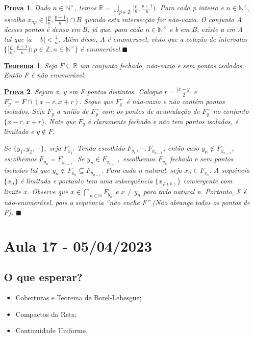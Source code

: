\documentclass{article}
\newtheorem*{theorem*}{\underline{Teorema}}
\newtheorem*{proof*}{\underline{Prova}}
\renewcommand\qedsymbol{$\blacksquare$}
\begin{document}
\begin{proof*}
  Dado $n\in \mathbb{N}^{\times}$, temos $\mathbb{R} = \displaystyle\bigcup_{p\in \mathbb{Z}}^{}{\biggl[\frac{p}{n}, \frac{p+1}{n}\biggr)}$. Para
  cada p inteiro e $n\in \mathbb{N}^{\times}$, escolha $x_{np}\in\biggl[\frac{p}{n}, \frac{p+1}{n}\biggr)\cap{B}$ quando esta intersec\c c\~ao
  for n\~ao-vazia. O conjunto A desses pontos \'e denso em B, j\'a que, para cada $n\in \mathbb{N}^{\times}$ e b em B, existe a em A
  tal que $|a-b|<\frac{1}{n}$. Al\'em disso, A \'e enumer\'avel, visto que a cole\c c\~ao de intervalos $\biggl\{\biggl[\frac{p}{n}, \frac{p+1}{n}\biggr): p\in \mathbb{Z}, n\in \mathbb{N}^{\times}\biggr\}$
  \'e enumer\'avel.\qedsymbol
\end{proof*}
\begin{theorem*}
  Seja $F\subseteq{\mathbb{R}}$ um conjunto fechado, n\~ao-vazio e sem pontos isolados. Ent\~ao F \'e n\~ao enumer\'avel.
\end{theorem*}
\begin{proof*}
  Sejam x, y em F pontos distintos. Coloque $r = \frac{|x-y|}{2}$ e $F_{y}^{\sim} = F\cap{(x-r, x+r)}.$ Segue que $F_{y}^{\sim}$
\'e n\~ao-vazio e n\~ao cont\'em pontos isolados. Seja $F_{y}$ a uni\~ao de $F_{y}^{\sim}$ com os pontos de acumula\c c\~ao de 
$F_{y}^{\sim}$ no conjunto $\{x-r,x+r\}.$ Note que $F_{y}$ \'e claramente fechado e n\~ao tem pontos isolados, \'e limitado e
$y\not\in F.$

  Se $\{y_{1},y_{2},\cdots\},$ seja $F_{y_{1}}.$ Tendo escolhido $F_{y_{1}},\cdots, F_{y_{n-1}}$, ent\~ao caso $y_{n}\not\in F_{y_{n-1}},$ 
escolhemos $F_{y_{n}}=F_{y_{n-1}}.$ Se $y_{n}\in F_{y_{n-1}},$ escolhemos $F_{y_{n}}$ fechado e sem pontos isolados tal que 
$y_{n}\not\in F_{y_{n}}\subseteq{F_{y_{n-1}}}.$ Para cada n natural, seja $x_{n}\in F_{y_{n}}.$ A sequ\^encia $\{x_{n}\}$ \'e limitada
e portanto tem uma subsequ\^encia $\{x_{\varphi(n)}\}$ convergente com limite $\overline{x}$. Observe que $\overline{x}\in \bigcap_{n\in \mathbb{N}}^{}{F_{y_{n}}}$ 
e $\overline{x}\neq y_{n}$ para todo natural n. Portanto, F \'e n\~ao-enumer\'avel, pois a sequ\^encia ``n\~ao enche F'' (N\~ao abrange
todos os pontos de F). \qedsymbol
\end{proof*}
\newpage

\section{Aula 17 - 05/04/2023}
\subsection{O que esperar?}
\begin{itemize}
  \item Coberturas e Teorema de Borel-Lebesgue;
  \item Compactos da Reta;
  \item Continuidade Uniforme.
\end{itemize}
\end{document}
